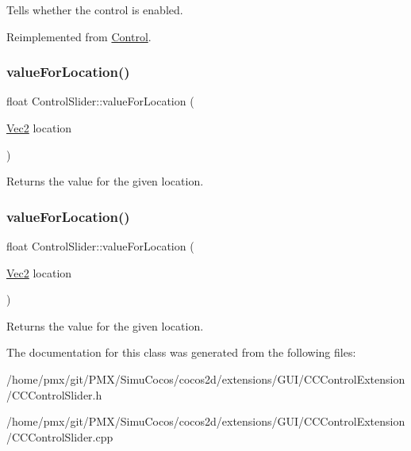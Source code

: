 Tells whether the control is enabled. 

Reimplemented from \hyperlink{classControl_a55339ae920182245d5ec114c33f4b1fd}{Control}.

\mbox{\label{classControlSlider_a0b368f5f16a815ecdf027252ef3f88e6}} 
\subsubsection{\texorpdfstring{value\+For\+Location()}{valueForLocation()}\hspace{0.1cm}{\footnotesize\ttfamily [1/2]}}
{\footnotesize\ttfamily float Control\+Slider\+::value\+For\+Location (\begin{DoxyParamCaption}\item[{\hyperlink{classVec2}{Vec2}}]{location }\end{DoxyParamCaption})\hspace{0.3cm}{\ttfamily [protected]}}

Returns the value for the given location. \mbox{\label{classControlSlider_a0b368f5f16a815ecdf027252ef3f88e6}} 
\subsubsection{\texorpdfstring{value\+For\+Location()}{valueForLocation()}\hspace{0.1cm}{\footnotesize\ttfamily [2/2]}}
{\footnotesize\ttfamily float Control\+Slider\+::value\+For\+Location (\begin{DoxyParamCaption}\item[{\hyperlink{classVec2}{Vec2}}]{location }\end{DoxyParamCaption})\hspace{0.3cm}{\ttfamily [protected]}}

Returns the value for the given location. 

The documentation for this class was generated from the following files\+:\begin{DoxyCompactItemize}
\item 
/home/pmx/git/\+P\+M\+X/\+Simu\+Cocos/cocos2d/extensions/\+G\+U\+I/\+C\+C\+Control\+Extension/C\+C\+Control\+Slider.\+h\item 
/home/pmx/git/\+P\+M\+X/\+Simu\+Cocos/cocos2d/extensions/\+G\+U\+I/\+C\+C\+Control\+Extension/C\+C\+Control\+Slider.\+cpp\end{DoxyCompactItemize}
